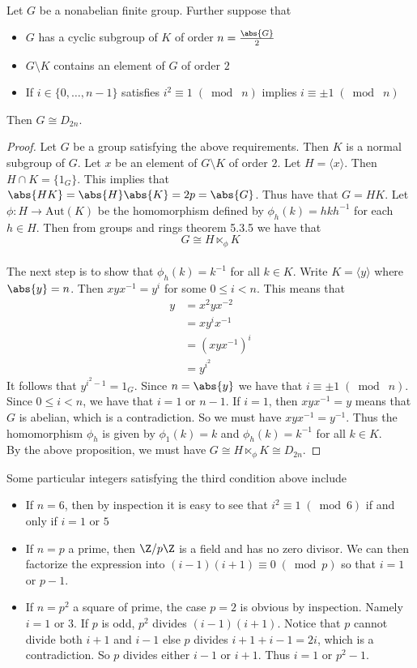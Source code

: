 \documentclass[a4paper]{article}
\begin{document}
\begin{thm}{}{}\\
Let $G$ be a nonabelian finite group. Further suppose that 
\begin{itemize}
\item $G$ has a cyclic subgroup of $K$ of order $n=\frac{\abs{G}}{2}$
\item $G\setminus K$ contains an element of $G$ of order $2$
\item If $i\in\{0,\dots,n-1\}$ satisfies $i^2\equiv 1\;(\bmod\; n)$ implies $i\equiv \pm 1\;(\bmod\; n)$
\end{itemize}
Then $G\cong D_{2n}$. 
\begin{proof}
Let $G$ be a group satisfying the above requirements. Then $K$ is a normal subgroup of $G$. Let $x$ be an element of $G\setminus K$ of order $2$. Let $H=\langle x\rangle$. Then $H\cap K=\{1_G\}$. This implies that $\abs{HK}=\abs{H}\abs{K}=2p=\abs{G}$. Thus have that $G=HK$. Let $\phi:H\to\text{Aut}(K)$ be the homomorphism defined by $\phi_h(k)=hkh^{-1}$ for each $h\in H$. Then from groups and rings theorem 5.3.5 we have that $$G\cong H\ltimes_\phi K$$~\\

The next step is to show that $\phi_h(k)=k^{-1}$ for all $k\in K$. Write $K=\langle y\rangle$ where $\abs{y}=n$. Then $xyx^{-1}=y^i$ for some $0\leq i<n$. This means that 
\begin{align*}
y&=x^2yx^{-2}\tag{$x^2=1$}\\
&=xy^ix^{-1}\\
&=(xyx^{-1})^i\\
&=y^{i^2}
\end{align*}
It follows that $y^{i^2-1}=1_G$. Since $n=\abs{y}$ we have that $i\equiv\pm1\;(\bmod\;n)$. Since $0\leq i<n$, we have that $i=1$ or $n-1$. If $i=1$, then $xyx^{-1}=y$ means that $G$ is abelian, which is a contradiction. So we must have $xyx^{-1}=y^{-1}$. Thus the homomorphism $\phi_h$ is given by $\phi_1(k)=k$ and $\phi_h(k)=k^{-1}$ for all $k\in K$. \\

By the above proposition, we must have $G\cong H\ltimes_\phi K\cong D_{2n}$. 
\end{proof}
\end{thm}

Some particular integers satisfying the third condition above include
\begin{itemize}
\item If $n=6$, then by inspection it is easy to see that $i^2\equiv 1\;(\bmod 6)$ if and only if $i=1$ or $5$
\item If $n=p$ a prime, then $\Z/p\Z$ is a field and has no zero divisor. We can then factorize the expression into $(i-1)(i+1)\equiv 0\;(\bmod p)$ so that $i=1$ or $p-1$. 
\item If $n=p^2$ a square of prime, the case $p=2$ is obvious by inspection. Namely $i=1$ or $3$. If $p$ is odd, $p^2$ divides $(i-1)(i+1)$. Notice that $p$ cannot divide both $i+1$ and $i-1$ else $p$ divides $i+1+i-1=2i$, which is a contradiction. So $p$ divides either $i-1$ or $i+1$. Thus $i=1$ or $p^2-1$. 
\end{itemize}
\end{document}
